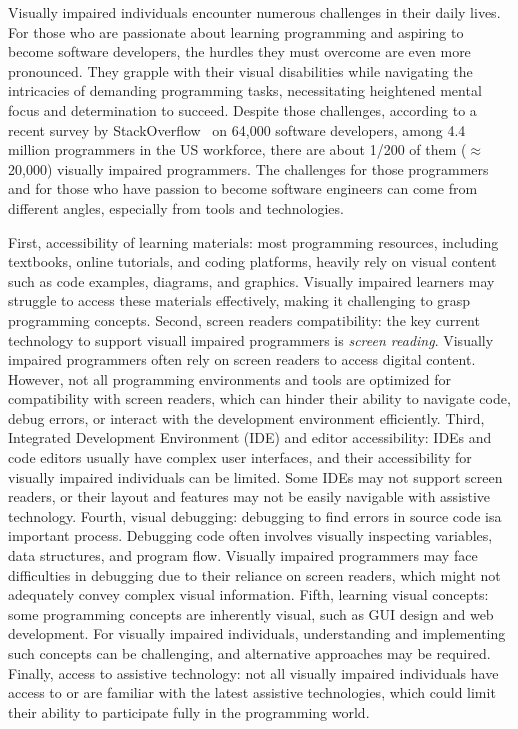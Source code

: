 


Visually impaired individuals encounter numerous challenges in their
daily lives. For those who are passionate about learning programming
and aspiring to become software developers, the hurdles they must
overcome are even more pronounced. They grapple with their visual
disabilities while navigating the intricacies of demanding programming
tasks, necessitating heightened mental focus and determination to
succeed. Despite those challenges, according to a recent survey by
StackOverflow~\cite{blind-code} on 64,000 software developers, among 4.4
million programmers in the US workforce, there are about 1/200 of them
($\approx$ 20,000) visually impaired programmers. The challenges for
those programmers and for those who have passion to become software
engineers can come from different angles, especially from tools
and technologies.

First, accessibility of learning materials: most programming
resources, including textbooks, online tutorials, and coding
platforms, heavily rely on visual content such as code examples,
diagrams, and graphics. Visually impaired learners may struggle to
access these materials effectively, making it challenging to grasp
programming concepts. Second, screen readers compatibility: the key
current technology to support visuall impaired programmers is {\em
screen reading}. Visually impaired programmers often rely on screen
readers to access digital content. However, not all programming
environments and tools are optimized for compatibility with screen
readers, which can hinder their ability to navigate code, debug
errors, or interact with the development environment efficiently.
Third, Integrated Development Environment (IDE) and editor
accessibility: IDEs and code editors usually have complex user
interfaces, and their accessibility for visually impaired individuals
can be limited. Some IDEs may not support screen readers, or their
layout and features may not be easily navigable with assistive
technology. Fourth, visual debugging: debugging to find errors in
source code isa important process. Debugging code often involves
visually inspecting variables, data structures, and program
flow. Visually impaired programmers may face difficulties in debugging
due to their reliance on screen readers, which might not adequately
convey complex visual information. Fifth, learning visual concepts:
some programming concepts are inherently visual, such as GUI design
and web development. For visually impaired individuals, understanding
and implementing such concepts can be challenging, and alternative
approaches may be required. Finally, access to assistive technology:
not all visually impaired individuals have access to or are familiar
with the latest assistive technologies, which could limit their
ability to participate fully in the programming world.

